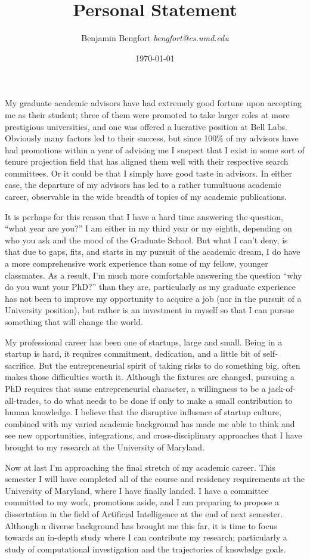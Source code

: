 \documentclass[11pt,letterpaper]{article}
\title{Personal Statement}
\author{Benjamin Bengfort \textit{bengfort@cs.umd.edu}}
\date{\today}
\begin{document}
\maketitle

My graduate academic advisors have had extremely good fortune upon accepting me as their student; three of them were promoted to take larger roles at more prestigious universities, and one was offered a lucrative position at Bell Labs. Obviously many factors led to their success, but since 100\% of my advisors have had promotions within a year of advising me I suspect that I exist in some sort of tenure projection field that has aligned them well with their respective search committees. Or it could be that I simply have good taste in advisors. In either case, the departure of my advisors has led to a rather tumultuous academic career, observable in the wide breadth of topics of my academic publications.

It is perhaps for this reason that I have a hard time answering the question, ``what year are you?'' I am either in my third year or my eighth, depending on who you ask and the mood of the Graduate School. But what I can't deny, is that due to gaps, fits, and starts in my pursuit of the academic dream, I do have a more comprehensive work experience than some of my fellow, younger classmates. As a result, I'm much more comfortable answering the question ``why do you want your PhD?'' than they are, particularly as my graduate experience has not been to improve my opportunity to acquire a job (nor in the pursuit of a University position), but rather is an investment in myself so that I can pursue something that will change the world.

My professional career has been one of startups, large and small. Being in a startup is hard, it requires commitment, dedication, and a little bit of self-sacrifice. But the entrepreneurial spirit of taking risks to do something big, often makes those difficulties worth it. Although the fixtures are changed, pursuing a PhD requires that same entrepreneurial character, a willingness to be a jack-of-all-trades, to do what needs to be done if only to make a small contribution to human knowledge. I believe that the disruptive influence of startup culture, combined with my varied academic background has made me able to think and see new opportunities, integrations, and cross-disciplinary approaches that I have brought to my research at the University of Maryland.

Now at last I'm approaching the final stretch of my academic career. This semester I will have completed all of the course and residency requirements at the University of Maryland, where I have finally landed. I have a committee committed to my work, promotions aside, and I am preparing to propose a dissertation in the field of Artificial Intelligence at the end of next semester. Although a diverse background has brought me this far, it is time to focus towards an in-depth study where I can contribute my research; particularly a study of computational investigation and the trajectories of knowledge goals.
\end{document}
